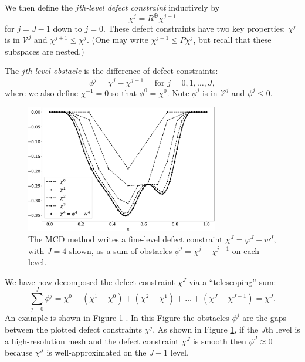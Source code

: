 \documentclass[letterpaper,final,12pt,reqno]{amsart}
\theoremstyle{claim}
\newcommand{\mR}{R^{\bm{\oplus}}}
\numberwithin{equation}{section}
\numberwithin{figure}{section}
\numberwithin{table}{section}
\numberwithin{theorem}{section}
\begin{document}
We then define the \emph{$j$th-level defect constraint} inductively by
\begin{equation}
  \chi^j = \mR \chi^{j+1}  \label{eq:chik}
\end{equation}
for $j=J-1$ down to $j=0$.  These defect constraints have two key properties: $\chi^j$ is in $\mathcal{V}^j$ and $\chi^{j+1} \le \chi^j$.  (One may write $\chi^{j+1} \le P \chi^j$, but recall that these subspaces are nested.)

The \emph{$j$th-level obstacle} is the difference of defect constraints:
\begin{equation}
  \phi^j = \chi^j - \chi^{j-1} \quad \text{ for } j=0,1,\dots,J,  \label{eq:levelobstacle}
\end{equation}
where we also define $\chi^{-1}=0$ so that $\phi^0 = \chi^0$.  Note $\phi^j$ is in $\mathcal{V}^j$ and $\phi^j\le 0$.

\begin{figure}
\includegraphics[width=0.75\textwidth]{fixfigs/decomp_defect.pdf}
\caption{The MCD method writes a fine-level defect constraint $\chi^J = \varphi^J - w^J$, with $J=4$ shown, as a sum of obstacles $\phi^j = \chi^j - \chi^{j-1}$ on each level.}
\label{fig:gooddecomposition}
\end{figure}

We have now decomposed the defect constraint $\chi^J$ via a ``telescoping'' sum:
\begin{equation}
  \sum_{j=0}^J \phi^j = \chi^0 + (\chi^1 - \chi^0) + (\chi^2 - \chi^1) + \dots + (\chi^J - \chi^{J-1}) = \chi^J.  \label{eq:telescopingdecomposition}
\end{equation}
An example is shown in Figure \ref{fig:gooddecomposition} \cite{GraeserKornhuber2009}.  In this Figure the obstacles $\phi^j$ are the gaps between the plotted defect constraints $\chi^j$.  As shown in Figure \ref{fig:gooddecomposition}, if the $J$th level is a high-resolution mesh and the defect constraint $\chi^J$ is smooth then $\phi^J\approx 0$ because $\chi^J$ is well-approximated on the $J-1$ level.
\end{document}
